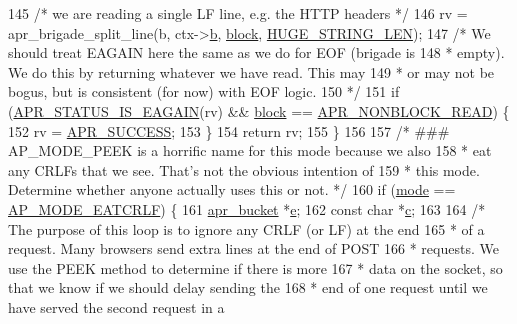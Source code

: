 \begin{DoxyCode}
145         \textcolor{comment}{/* we are reading a single LF line, e.g. the HTTP headers */}
146         rv = apr\_brigade\_split\_line(b, ctx->\hyperlink{structcore__filter__ctx_ab083b63e4b9c6f6a8b722fefd6e18da3}{b}, \hyperlink{group__APACHE__CORE__FILTER_gafe0ebf200b97a61a45c0513334da9ab6}{block}, \hyperlink{group__APACHE__CORE__DAEMON_ga0c9dd98f46b90b5bcd4cbf75e252d0da}{HUGE\_STRING\_LEN});
147         \textcolor{comment}{/* We should treat EAGAIN here the same as we do for EOF (brigade is}
148 \textcolor{comment}{         * empty).  We do this by returning whatever we have read.  This may}
149 \textcolor{comment}{         * or may not be bogus, but is consistent (for now) with EOF logic.}
150 \textcolor{comment}{         */}
151         \textcolor{keywordflow}{if} (\hyperlink{group__APR__STATUS__IS_ga9dd578bfcd76a2d997395608ae5b3a4e}{APR\_STATUS\_IS\_EAGAIN}(rv) && \hyperlink{group__APACHE__CORE__FILTER_gafe0ebf200b97a61a45c0513334da9ab6}{block} == 
      \hyperlink{group__APR__Util__Bucket__Brigades_gga756973fb6392bd1026c3d96b4519776da42b97663ca71fbbf2e2af7c8192e5dd8}{APR\_NONBLOCK\_READ}) \{
152             rv = \hyperlink{group__apr__errno_ga9ee311b7bf1c691dc521d721339ee2a6}{APR\_SUCCESS};
153         \}
154         \textcolor{keywordflow}{return} rv;
155     \}
156 
157     \textcolor{comment}{/* ### AP\_MODE\_PEEK is a horrific name for this mode because we also}
158 \textcolor{comment}{     * eat any CRLFs that we see.  That's not the obvious intention of}
159 \textcolor{comment}{     * this mode.  Determine whether anyone actually uses this or not. */}
160     \textcolor{keywordflow}{if} (\hyperlink{group__APACHE__CORE__FILTER_gad194431669b7d1f96d2dacfb7be21261}{mode} == \hyperlink{util__filter_8h_ab570898d09fbbe5b6d838e28b90134e0af543cdfe643b008e79518630f9dc8638}{AP\_MODE\_EATCRLF}) \{
161         \hyperlink{structapr__bucket}{apr\_bucket} *\hyperlink{group__APR__Util__Bucket__Brigades_gacd90314acb2c2e5cd19681136c08efac}{e};
162         \textcolor{keyword}{const} \textcolor{keywordtype}{char} *\hyperlink{group__APACHE__CORE__HTTPD_ga7cce37ef8558e46f408cb4d0f555605b}{c};
163 
164         \textcolor{comment}{/* The purpose of this loop is to ignore any CRLF (or LF) at the end}
165 \textcolor{comment}{         * of a request.  Many browsers send extra lines at the end of POST}
166 \textcolor{comment}{         * requests.  We use the PEEK method to determine if there is more}
167 \textcolor{comment}{         * data on the socket, so that we know if we should delay sending the}
168 \textcolor{comment}{         * end of one request until we have served the second request in a}

\end{DoxyCode}
